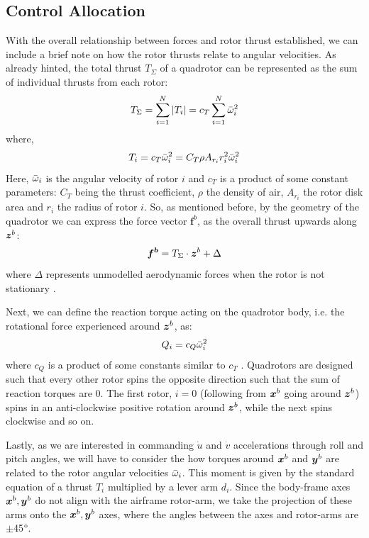 \subsection{Control Allocation}
With the overall relationship between forces and rotor thrust established, we can include a brief note on how the rotor thrusts relate to angular velocities.
As already hinted, the total thrust $T_\Sigma$ of a quadrotor can be represented as the sum of individual thrusts from each rotor:
\begin{equation}
    T_\Sigma = \sum^N_{i=1} |T_i| = c_T \sum^N_{i=1} \Bar{\omega}_i^2 \label{4_2_totalThrust}
\end{equation}
where,
\begin{equation}
    T_i = c_T \Bar{\omega}_i^2 = C_T \rho A_{r_i} r_i^2 \Bar{\omega}_i^2
\end{equation}
Here, $\Bar{\omega}_i$ is the angular velocity of rotor $i$ and $c_T$ is a product of some constant parameters: $C_T$ being the thrust coefficient, $\rho$ the density of air, $A_{r_i}$ the rotor disk area and $r_i$ the radius of rotor $i$. So, as mentioned before, by the geometry of the quadrotor we can express the force vector $\boldsymbol{f}^b$, as the overall thrust upwards along ${\boldsymbol{z}}^b$:
\begin{equation}
    \boldsymbol{f^b} = T_\Sigma \cdot {\boldsymbol{z}}^b + \Delta
\end{equation}
where $\Delta$ represents unmodelled aerodynamic forces when the rotor is not stationary \cite{MultirotorAerialVehicles}. 

Next, we can define the reaction torque acting on the quadrotor body, i.e. the rotational force experienced around ${\boldsymbol{z}}^b$, as:
\begin{equation}
    Q_i = c_Q \Bar{\omega}_i^2
\end{equation}
where $c_Q$ is a product of some constants similar to $c_T$ \cite{MultirotorAerialVehicles}. Quadrotors are designed such that every other rotor spins the opposite direction such that the sum of reaction torques are 0. The first rotor, $i=0$ (following from ${\boldsymbol{x}}^b$ going around ${\boldsymbol{z}}^b$) spins in an anti-clockwise positive rotation around ${\boldsymbol{z}}^b$, while the next spins clockwise and so on.

Lastly, as we are interested in commanding $\dot u$ and $\dot v$ accelerations through roll and pitch angles, we will have to consider the how torques around ${\boldsymbol{x}}^b$ and ${\boldsymbol{y}}^b$ are related to the rotor angular velocities $\Bar{\omega}_i$. This moment is given by the standard equation of a thrust $T_i$ multiplied by a lever arm $d_i$. Since the body-frame axes ${\boldsymbol{x}}^b,{\boldsymbol{y}}^b$ do not align with the airframe rotor-arm, we take the projection of these arms onto the  ${\boldsymbol{x}}^b,{\boldsymbol{y}}^b$ axes, where the angles between the axes and rotor-arms are $\pm$45$\degree$.


